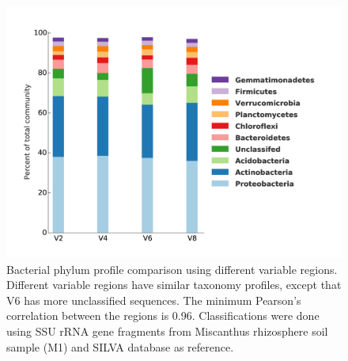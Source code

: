 \documentclass[]{msu-thesis}
\begin{document}
\begin{figure}[tbph!]
  \centering
  \includegraphics[width=1\textwidth]{figs/chap2_figS6}
  \caption[Bacterial phylum profile comparison using different variable regions]{Bacterial phylum profile comparison using different variable regions. Different variable regions have similar taxonomy profiles, except that V6 has more unclassified sequences. The minimum Pearson’s correlation between the regions is 0.96. Classifications were done using SSU rRNA gene fragments from Miscanthus rhizosphere soil sample (M1) and SILVA database as reference.}
  \label{fig:chap2FigS6}
\end{figure}
\end{document}
